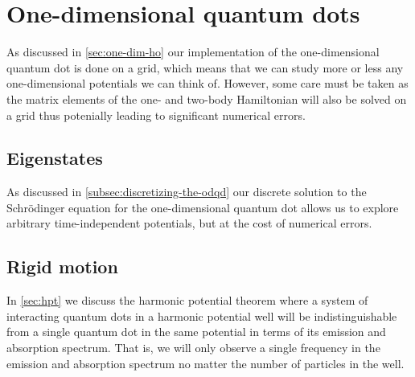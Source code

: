 \section{One-dimensional quantum dots}
    As discussed in \autoref{sec:one-dim-ho} our implementation of the
    one-dimensional quantum dot is done on a grid, which means that we can study
    more or less any one-dimensional potentials we can think of.
    However, some care must be taken as the matrix elements of the one- and
    two-body Hamiltonian will also be solved on a grid thus potenially leading
    to significant numerical errors.

    \subsection{Eigenstates}
        As discussed in \autoref{subsec:discretizing-the-odqd} our discrete
        solution to the Schrödinger equation for the one-dimensional quantum dot
        allows us to explore arbitrary time-independent potentials, but at the
        cost of numerical errors.

    \subsection{Rigid motion}
        In \autoref{sec:hpt} we discuss the harmonic potential theorem where a
        system of interacting quantum dots in a harmonic potential well will be
        indistinguishable from a single quantum dot in the same potential in
        terms of its emission and absorption spectrum.
        That is, we will only observe a single frequency in the emission and
        absorption spectrum no matter the number of particles in the well.
